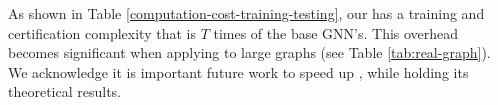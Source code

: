 \vspace{+0.05in}
 As shown in Table \ref{computation-cost-training-testing}, our {\name} has a training and certification complexity that is $T$ times of the base GNN's. This overhead becomes significant when applying {\name} to large graphs (see Table \ref{tab:real-graph}). 
We acknowledge it is important future work to speed up {\name}, while holding its theoretical results.


